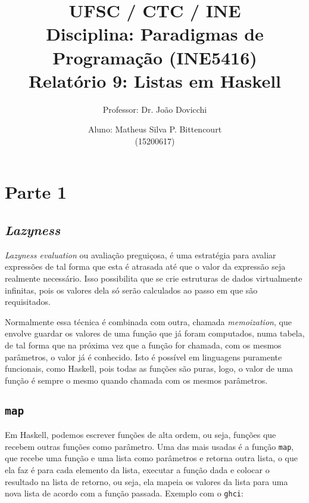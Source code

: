 \documentclass[a4paper,twocolumn,10pt]{article}
\begin{document}
\title{
	\large \rm UFSC / CTC / INE\\
	\large \rm Disciplina: Paradigmas de Programação (INE5416)\\
	\Large \bf Relatório 9: Listas em Haskell
}

\author{
	Professor: Dr. João Dovicchi\\
	\and
	Aluno: Matheus Silva P. Bittencourt\\(15200617)
}

\maketitle

\thispagestyle{empty} %

\section*{Parte 1}

\subsection*{\textit{Lazyness}}

\textit{Lazyness evaluation} ou avaliação preguiçosa, é uma estratégia para
avaliar expressões de tal forma que esta é atrasada até que o valor da
expressão seja realmente necessário. Isso possibilita que se crie estruturas de
dados virtualmente infinitas, pois os valores dela só serão calculados ao passo
em que são requisitados.

Normalmente essa técnica é combinada com outra, chamada \textit{memoization},
que envolve guardar os valores de uma função que já foram computados, numa
tabela, de tal forma que na próxima vez que a função for chamada, com os mesmos
parâmetros, o valor já é conhecido. Isto é possível em linguagens puramente
funcionais, como Haskell, pois todas as funções são puras, logo, o valor de uma
função é sempre o mesmo quando chamada com os mesmos parâmetros.

\subsection*{\texttt{map}}

Em Haskell, podemos escrever funções de alta ordem, ou seja, funções que
recebem outras funções como parâmetro. Uma das mais usadas é a função
\texttt{map}, que recebe uma função e uma lista como parâmetros e retorna outra
lista, o que ela faz é para cada elemento da lista, executar a função dada e
colocar o resultado na lista de retorno, ou seja, ela mapeia os valores da
lista para uma nova lista de acordo com a função passada. Exemplo com o
\texttt{ghci}:
\end{document}
